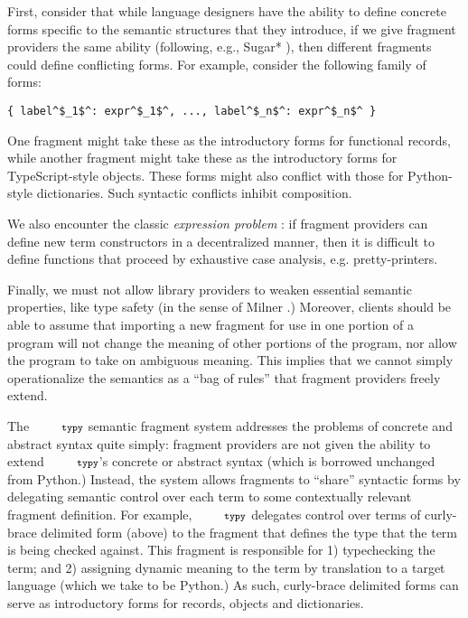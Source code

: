 \documentclass[10pt]{sigplanconf}
\newcommand{\typy}{\texttt{\footnotesize typy}}
\begin{document}

First, consider that while language designers have the ability to define concrete forms specific to the semantic structures that they introduce, if we give fragment providers the same ability (following, e.g., Sugar* \cite{erdweg2013framework}), then different fragments could define conflicting forms. For example, consider the following family of forms:
\vspace{-2px}\begin{lstlisting}[numbers=none]
{ label^$_1$^: expr^$_1$^, ..., label^$_n$^: expr^$_n$^ }
\end{lstlisting}
One fragment might take these as the introductory forms for functional records, while another fragment might take these as the introductory forms for TypeScript-style objects. These forms might also conflict with those for Python-style dictionaries. Such syntactic conflicts inhibit composition.

We also encounter the classic \emph{expression problem} \cite{wadler1998expression,Reynolds75}: if fragment providers can define new term constructors in a decentralized manner, then it is difficult to define functions that proceed by exhaustive case analysis, e.g. pretty-printers.

Finally, we must not allow library providers to weaken essential semantic properties, like type safety (in the sense of Milner \cite{DBLP:journals/jcss/Milner78}.) Moreover, clients should be able to  assume that importing a new fragment for use in one portion of a program will not change the meaning of other portions of the program, nor allow the program to take on ambiguous meaning. This implies that we cannot simply operationalize the semantics as a ``bag of rules'' that fragment providers freely extend.

The $\typy$ semantic fragment system addresses the problems of concrete and abstract syntax quite simply: fragment providers are not given the ability to extend $\typy$'s concrete or abstract syntax (which is borrowed unchanged from Python.)  Instead, the system allows fragments to ``share'' syntactic forms by delegating semantic control over each term to some contextually relevant fragment definition. For example, $\typy$ delegates control over terms of curly-brace delimited form (above) to the fragment that defines the type that the term is being checked against. This fragment is responsible for 1) typechecking the term; and 2) assigning dynamic meaning to the term by translation to a target language (which we take to be Python.) As such, curly-brace delimited forms can serve as introductory forms for records, objects and dictionaries. 
\end{document}
